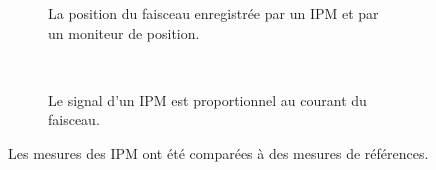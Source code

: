 \begin{figure}[!ht]
	\begin{subfigure}[t]{0.5\textwidth}
		
		\caption[]{La position du faisceau enregistrée par un IPM et par un moniteur de position.}
		\label{sumfr:fig:beam_car_a}
	\end{subfigure}
	~
	\begin{subfigure}[t]{0.45\textwidth}
		
		\caption[]{Le signal d'un IPM est proportionnel au courant du faisceau.}
		\label{sumfr:fig:beam_car_b}
	\end{subfigure}
  \caption[]{Les mesures des IPM ont été comparées à des mesures de références.}
	\label{sumfr:fig:beam_car}
\end{figure}
